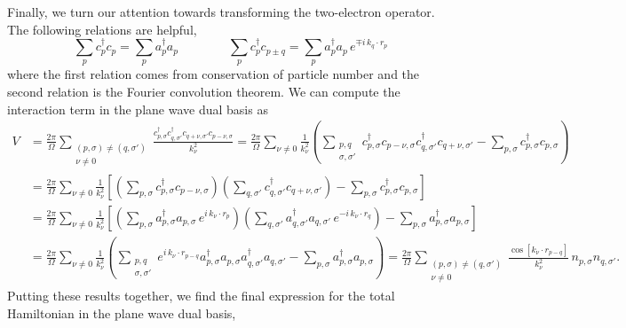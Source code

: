 \documentclass[superscriptaddress,aps,pra,nofootinbib,notitlepage,10pt,longbibliography]{revtex4-1}
\begin{document}
Finally, we turn our attention towards transforming the two-electron operator. The following relations are helpful,
\begin{equation}
\sum_{p} c^\dagger_p c_p = \sum_p a^\dagger_{p} a_p
\quad \quad \quad \quad
\sum_{p} c^\dagger_p c_{p \pm q} = \sum_p a^\dagger_{p} a_{p} \, e^{\mp i \, k_q \cdot r_p}
\end{equation}
where the first relation comes from conservation of particle number and the second relation is the Fourier convolution theorem. We can compute the interaction term in the plane wave dual basis as
\begin{align}
\label{eq:pwd_v}
V &=  \frac{2 \pi}{\Omega} \sum_{\substack{(p, \sigma) \neq (q, \sigma') \\ \nu \neq 0}} \frac{c^\dagger_{p,\sigma} c_{q,\sigma'}^\dagger c_{q + \nu,\sigma'} c_{p - \nu,\sigma}}{k_\nu^2}
%
 = \frac{2 \pi}{\Omega} \sum_{\nu \neq 0} \frac{1}{k_\nu^2}\left( \sum_{\substack{p,q \\ \sigma, \sigma'}} c^\dagger_{p,\sigma} c_{p - \nu,\sigma} c^\dagger_{q,\sigma'} c_{q + \nu,\sigma'}  - \sum_{p,\sigma} c_{p,\sigma}^\dagger c_{p,\sigma}\right)\\
 & = \frac{2 \pi}{\Omega} \sum_{\nu \neq 0} \frac{1}{k_\nu^2}\left[ \left( \sum_{p,\sigma} c^\dagger_{p,\sigma} c_{p - \nu,\sigma}\right)\left( \sum_{q, \sigma'} c^\dagger_{q,\sigma'} c_{q + \nu,\sigma'} \right)  - \sum_{p,\sigma} c^\dagger_{p,\sigma} c_{p,\sigma} \right] \nonumber\\
 & = \frac{2 \pi}{\Omega} \sum_{\nu \neq 0} \frac{1}{k_\nu^2}\left[ \left( \sum_{p,\sigma} a^\dagger_{p,\sigma} a_{p,\sigma} \, e^{i \, k_\nu \cdot r_p}\right)\left( \sum_{q, \sigma'} a^\dagger_{q,\sigma'} a_{q,\sigma'} \, e^{-i \, k_\nu \cdot r_q} \right)  - \sum_{p,\sigma} a^\dagger_{p,\sigma} a_{p,\sigma} \right] \nonumber\\
 & =  \frac{2 \pi}{\Omega} \sum_{\nu \neq 0} \frac{1}{k_\nu^2} \left( \sum_{\substack{p,q \\ \sigma, \sigma'}} e^{i \, k_\nu \cdot r_{p -q}}  a_{p, \sigma}^\dagger a_{p, \sigma} a_{q, \sigma'}^\dagger a_{q,\sigma'} - \sum_{p, \sigma} a_{p, \sigma}^\dagger a_{p,\sigma} \right) 
%
 =  \frac{2 \pi}{\Omega } \sum_{\substack{(p, \sigma) \neq (q, \sigma') \\ \nu \neq 0}} \frac{\cos \left[k_\nu \cdot r_{p-q}\right]}{k_\nu^2} \, n_{p, \sigma} n_{q, \sigma'}.\nonumber
 \end{align}
Putting these results together, we find the final expression for the total Hamiltonian in the plane wave dual basis,
\end{document}
